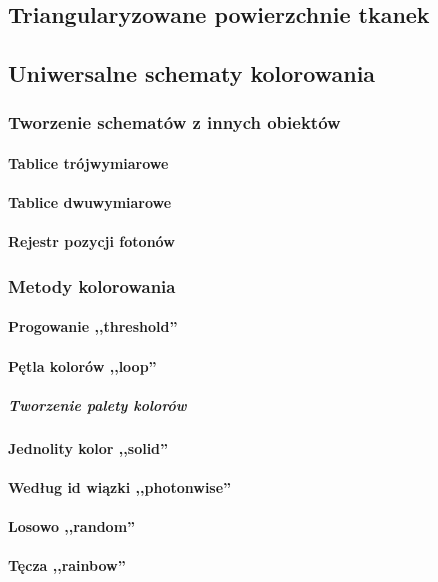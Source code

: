 \subsection{Triangularyzowane powierzchnie tkanek}
\subsection{Uniwersalne schematy kolorowania}
\subsubsection{Tworzenie schematów z innych obiektów}
\paragraph{Tablice trójwymiarowe}
\paragraph{Tablice dwuwymiarowe}
\paragraph{Rejestr pozycji fotonów}
\subsubsection{Metody kolorowania}
\paragraph{Progowanie ,,threshold''}
\paragraph{Pętla kolorów ,,loop''}
\subparagraph{Tworzenie palety kolorów}
\paragraph{Jednolity kolor ,,solid''}
\paragraph{Według id wiązki ,,photonwise''}
\paragraph{Losowo ,,random''}
\paragraph{Tęcza ,,rainbow''}
